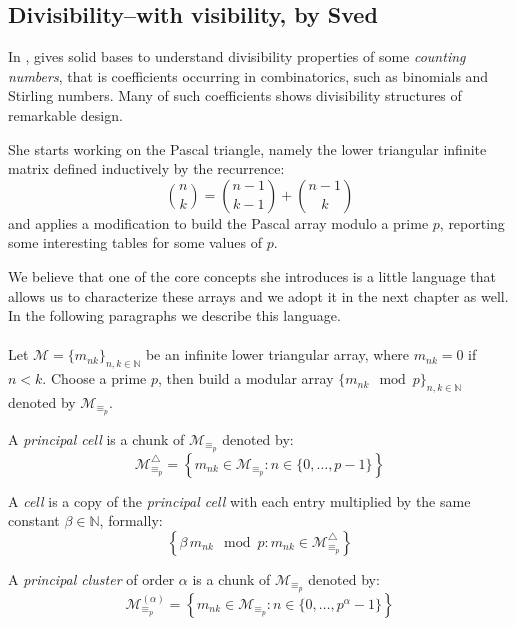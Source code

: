 \subsection{Divisibility--with visibility, by Sved}

In \cite{sved:1988}, \citeauthor{sved:1988} gives solid bases to understand
divisibility properties of some \emph{counting numbers}, that is coefficients
occurring in combinatorics, such as binomials and Stirling numbers. Many of
such coefficients shows divisibility structures of remarkable design. 

She starts working on the Pascal triangle, namely the lower triangular infinite
matrix defined inductively by the recurrence: 
\begin{equation}
    {{n}\choose{k}}={{n-1}\choose{k-1}}+{{n-1}\choose{k}}
    \label{eq:binomial:recurrence}
\end{equation}
and applies a modification to build the Pascal array modulo a prime $p$, 
reporting some interesting tables for some values of $p$.

We believe that one of the core concepts she introduces is a little language
that allows us to characterize these arrays and we adopt it in the next chapter
as well. In the following paragraphs we describe this language. 
\\\\
Let $\mathcal{M}=\lbrace m_{nk}\rbrace_{n,k\in\mathbb{N}}$ 
be an infinite lower triangular array, where $m_{nk}=0$ if 
$n<k$. Choose a prime $p$, then build a modular array
$\lbrace m_{nk}\mod p\rbrace_{n,k\in\mathbb{N}}$ denoted by $\mathcal{M}_{\equiv_{p}}$.

A \emph{principal cell} is a chunk of $\mathcal{M}_{\equiv_{p}}$ denoted by:
\begin{displaymath}
    \mathcal{M}_{\equiv_{p}}^{\bigtriangleup} = 
        \left\lbrace m_{nk}\in \mathcal{M}_{\equiv_{p}}: n\in\lbrace 0,\ldots,p-1\rbrace\right\rbrace
\end{displaymath}

A \emph{cell} is a copy of the \emph{principal cell} with each entry multiplied 
by the same constant $\beta\in\mathbb{N}$, formally:
\begin{displaymath}
    \left\lbrace \beta\,m_{nk}\mod p:m_{nk}\in \mathcal{M}_{\equiv_{p}}^{\bigtriangleup}\right\rbrace
\end{displaymath}

A \emph{principal cluster} of order $\alpha$ is a chunk of $\mathcal{M}_{\equiv_{p}}$ denoted by:
\begin{displaymath}
    \mathcal{M}_{\equiv_{p}}^{(\alpha)} = 
        \left\lbrace m_{nk}\in \mathcal{M}_{\equiv_{p}}: n\in\lbrace 0,\ldots,p^{\alpha}-1\rbrace\right\rbrace
\end{displaymath}

